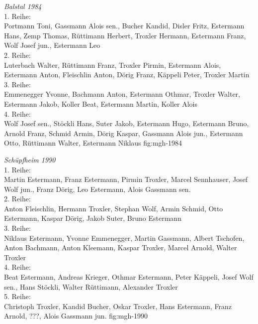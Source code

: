 \documentclass[]{book}
\begin{document}
{\emph{Balstal 1984}\\
    1. Reihe:\\
    Portmann Toni, Gassmann Alois sen., Bucher Kandid, Disler Fritz, Estermann
    Hans, Zemp Thomas, Rüttimann Herbert, Troxler Hermann, Estermann Franz, Wolf
    Josef jun., Estermann Leo\\
    2. Reihe:\\
    Luterbach Walter, Rüttimann Franz, Troxler Pirmin, Estermann Alois,
    Estermann Anton, Fleischlin Anton, Dörig Franz, Käppeli Peter, Troxler
    Martin\\
    3. Reihe:\\
    Emmenegger Yvonne, Bachmann Anton, Estermann Othmar, Troxler Walter,
    Estermann Jakob, Koller Beat, Estermann Martin, Koller Alois\\
    4. Reihe:\\
    Wolf Josef sen., Stöckli Hans, Suter Jakob, Estermann Hugo, Estermann Bruno,
    Arnold Franz, Schmid Armin, Dörig Kaspar, Gassmann Alois jun., Estermann
    Otto, Rüttimann Walter, Estermann Niklaus }
{fig:mgh-1984}


{\emph{Schüpfheim 1990}\\
    1. Reihe:\\
    Martin Estermann, Franz Estermann, Pirmin Troxler, Marcel Sennhauser, Josef Wolf jun., Franz Dörig, Leo Estermann, Alois Gassmann sen.\\
    2. Reihe:\\
    Anton Fleischlin, Hermann Troxler, Stephan Wolf, Armin Schmid, Otto Estermann, Kaspar Dörig, Jakob Suter, Bruno Estermann\\
    3. Reihe:\\
    Niklaus Estermann, Yvonne Emmenegger, Martin Gassmann, Albert Tschofen, Anton Bachmann, Anton Kleemann, Kaspar Troxler, Marcel Arnold, Walter Troxler\\
    4. Reihe:\\
    Beat Estermann, Andreas Krieger, Othmar Estermann, Peter Käppeli, Josef Wolf sen., Hans Stöckli, Walter Rüttimann, Alexander Troxler\\
    5. Reihe:\\
    Christoph Troxler, Kandid Bucher, Oskar Troxler, Hans Estermann, Franz Arnold, ???, Alois Gassmann jun.
} {fig:mgh-1990}
\end{document}
